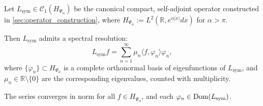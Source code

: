 \begin{proposition}
\label{prop:spectral_resolution_Lsym}
Let \( L_{\mathrm{sym}} \in \mathcal{C}_1(H_{\Psi_\alpha}) \) be the canonical compact, self-adjoint operator constructed in \cref{sec:operator_construction}, where \( H_{\Psi_\alpha} := L^2(\mathbb{R}, e^{\alpha |x|} dx) \) for \( \alpha > \pi \).

Then \( L_{\mathrm{sym}} \) admits a spectral resolution:
\[
L_{\mathrm{sym}} f = \sum_{n=1}^\infty \mu_n \langle f, \varphi_n \rangle \varphi_n,
\]
where \( \{ \varphi_n \} \subset H_{\Psi_\alpha} \) is a complete orthonormal basis of eigenfunctions of \( L_{\mathrm{sym}} \), and \( \mu_n \in \mathbb{R} \setminus \{0\} \) are the corresponding eigenvalues, counted with multiplicity.

The series converges in norm for all \( f \in H_{\Psi_\alpha} \), and each \( \varphi_n \in \operatorname{Dom}(L_{\mathrm{sym}}) \).
\end{proposition}
